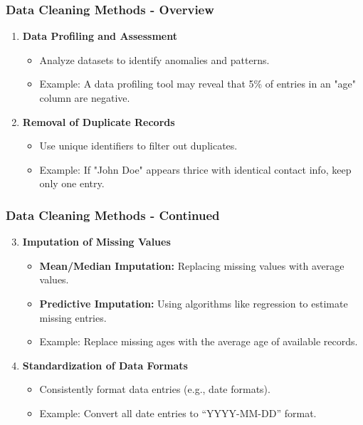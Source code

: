 \documentclass{beamer}
\begin{document}
\begin{frame}[fragile]
    \frametitle{Data Cleaning Methods - Overview}
    \begin{enumerate}
        \item \textbf{Data Profiling and Assessment}
        \begin{itemize}
            \item Analyze datasets to identify anomalies and patterns.
            \item Example: A data profiling tool may reveal that 5\% of entries in an "age" column are negative.
        \end{itemize}
        \item \textbf{Removal of Duplicate Records}
        \begin{itemize}
            \item Use unique identifiers to filter out duplicates.
            \item Example: If "John Doe" appears thrice with identical contact info, keep only one entry.
        \end{itemize}
    \end{enumerate}
\end{frame}

\begin{frame}[fragile]
    \frametitle{Data Cleaning Methods - Continued}
    \begin{enumerate}
        \setcounter{enumi}{2} %
        \item \textbf{Imputation of Missing Values}
        \begin{itemize}
            \item \textbf{Mean/Median Imputation:} Replacing missing values with average values.
            \item \textbf{Predictive Imputation:} Using algorithms like regression to estimate missing entries.
            \item Example: Replace missing ages with the average age of available records.
        \end{itemize}
        \item \textbf{Standardization of Data Formats}
        \begin{itemize}
            \item Consistently format data entries (e.g., date formats).
            \item Example: Convert all date entries to “YYYY-MM-DD” format.
        \end{itemize}
    \end{enumerate}
\end{frame}
\end{document}
